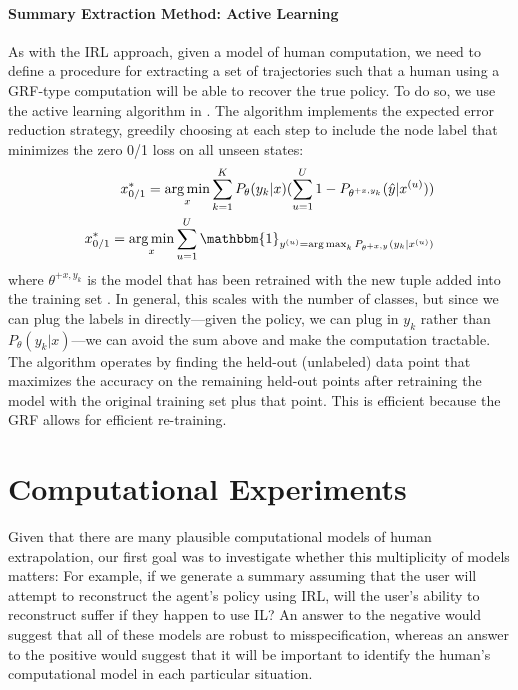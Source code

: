 \documentclass{article}
\DeclareMathOperator*{\argmax}{arg\,max}
\DeclareMathOperator*{\argmin}{arg\,min}
\begin{document}
\paragraph{Summary Extraction Method: Active Learning}
As with the IRL approach, given a model of human computation, we need to define a procedure for extracting a set of trajectories such that a human using a GRF-type computation will be able to recover the true policy. To do so, we use the active learning algorithm in \cite{zhu2003}. The algorithm implements the expected error reduction strategy, greedily choosing at each step to include the node label that minimizes the zero 0/1 loss on all unseen states:
\begin{eqnarray*}\label{eq_ALloss}
x^*_{0/1} = \argmin_{x} \sum_{k=1}^{K} P_{\theta}(y_k|x) ( \sum_{u=1}^{U} 1 - P_{\theta^{+x, y_k}}(\hat{y}|x^{(u)}) ) \\
x^*_{0/1} = \argmin_{x} \sum_{u=1}^{U} \mathbbm{1}_{y^{(u)} = \argmax_{k} P_{\theta^{+x,y}}(y_k|x^{(u)})}
\end{eqnarray*}
where $\theta^{+x, y_k}$ is the model that has been retrained with the new tuple added into the training set 
\cite{settles2010active}. In general, this scales with the number of classes, but since we can plug the labels in directly---given the policy, we can plug in $y_k$ rather than $P_{\theta}(y_k|x)$---we can avoid the sum above and make the computation tractable. The algorithm operates by finding the held-out (unlabeled) data point that maximizes the accuracy on the remaining held-out points after retraining the model with the original training set plus that point. This is efficient because the GRF allows for efficient re-training.

\section{Computational Experiments}
Given that there are many plausible computational models of human extrapolation, our first goal was to investigate whether this multiplicity of models matters: For example, if we generate a summary assuming that the user will attempt to reconstruct the agent's policy using IRL, will the user's ability to reconstruct suffer if they happen to use IL? An answer to the negative would suggest that all of these models are robust to misspecification, whereas an answer to the positive would suggest that it will be important to identify the human's computational model in each particular situation.
\end{document}
